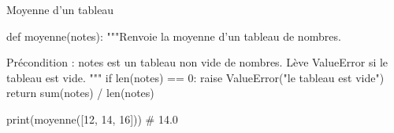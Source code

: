 

\begin{codereference}{Moyenne d'un tableau}
\begin{python}
def moyenne(notes):
    """Renvoie la moyenne d'un tableau de nombres.

    Précondition : notes est un tableau non vide de nombres.
    Lève ValueError si le tableau est vide.
    """
    if len(notes) == 0:
        raise ValueError("le tableau est vide")
    return sum(notes) / len(notes)

print(moyenne([12, 14, 16]))  # 14.0
\end{python}
\end{codereference}


